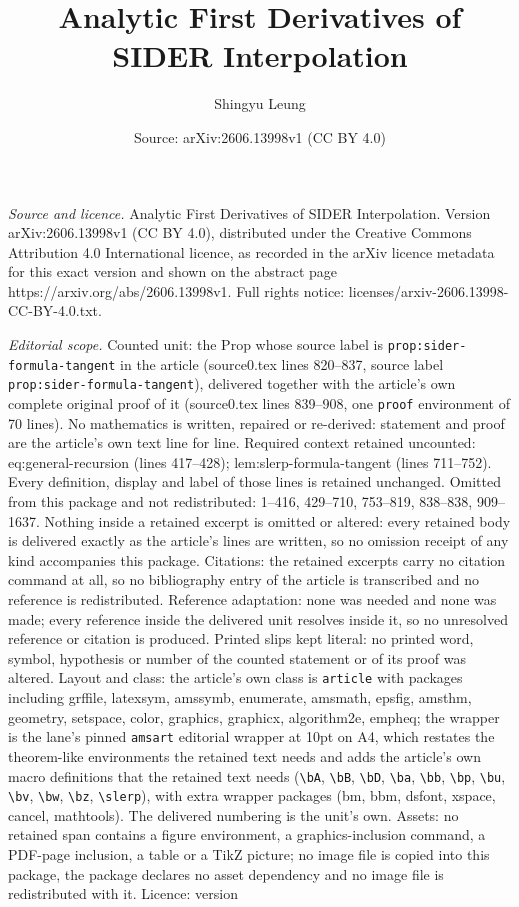 \documentclass[10pt,a4paper]{amsart}
\title[Analytic First Derivatives of SIDER Interpolation]{Analytic First Derivatives of SIDER Interpolation}
\author{Shingyu Leung}
\date{Source: arXiv:2606.13998v1 (CC BY 4.0)}
\begin{document}
\maketitle

\noindent\emph{Source and licence.} Analytic First Derivatives of SIDER Interpolation. Version arXiv:2606.13998v1 (CC BY 4.0), distributed under the Creative Commons Attribution 4.0 International licence, as recorded in the arXiv licence metadata for this exact version and shown on the abstract page https://arxiv.org/abs/2606.13998v1. Full rights notice: licenses/arxiv-2606.13998-CC-BY-4.0.txt.\par\smallskip

\noindent\textit{Editorial scope.} Counted unit: the Prop whose source label is \texttt{prop:sider-formula-tangent} in the article (source0.tex lines 820--837, source label \texttt{prop:sider-formula-tangent}), delivered together with the article's own complete original proof of it (source0.tex lines 839--908, one \texttt{proof} environment of 70 lines). No mathematics is written, repaired or re-derived: statement and proof are the article's own text line for line. Required context retained uncounted: eq:general-recursion (lines 417--428); lem:slerp-formula-tangent (lines 711--752). Every definition, display and label of those lines is retained unchanged. Omitted from this package and not redistributed: 1--416, 429--710, 753--819, 838--838, 909--1637. Nothing inside a retained excerpt is omitted or altered: every retained body is delivered exactly as the article's lines are written, so no omission receipt of any kind accompanies this package. Citations: the retained excerpts carry no citation command at all, so no bibliography entry of the article is transcribed and no reference is redistributed. Reference adaptation: none was needed and none was made; every reference inside the delivered unit resolves inside it, so no unresolved reference or citation is produced. Printed slips kept literal: no printed word, symbol, hypothesis or number of the counted statement or of its proof was altered. Layout and class: the article's own class is \texttt{article} with packages including grffile, latexsym, amssymb, enumerate, amsmath, epsfig, amsthm, geometry, setspace, color, graphics, graphicx, algorithm2e, empheq; the wrapper is the lane's pinned \texttt{amsart} editorial wrapper at 10pt on A4, which restates the theorem-like environments the retained text needs and adds the article's own macro definitions that the retained text needs (\texttt{\textbackslash bA}, \texttt{\textbackslash bB}, \texttt{\textbackslash bD}, \texttt{\textbackslash ba}, \texttt{\textbackslash bb}, \texttt{\textbackslash bp}, \texttt{\textbackslash bu}, \texttt{\textbackslash bv}, \texttt{\textbackslash bw}, \texttt{\textbackslash bz}, \texttt{\textbackslash slerp}), with extra wrapper packages (bm, bbm, dsfont, xspace, cancel, mathtools). The delivered numbering is the unit's own. Assets: no retained span contains a figure environment, a graphics-inclusion command, a PDF-page inclusion, a table or a TikZ picture; no image file is copied into this package, the package declares no asset dependency and no image file is redistributed with it. Licence: version 
\end{document}
